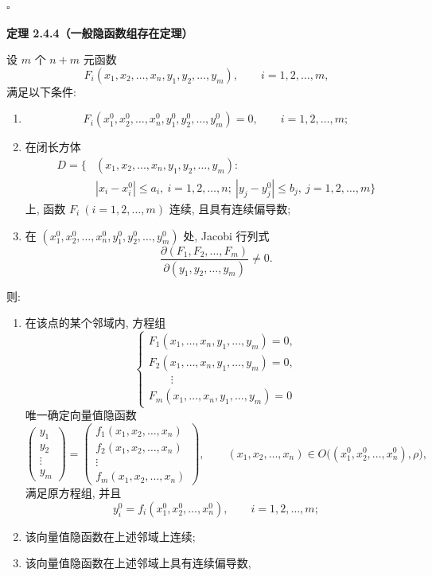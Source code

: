$\square$





\textbf{定理 2.4.4（一般隐函数组存在定理）}


	设 $m$ 个 $n+m$ 元函数
	\[
	F_i(x_1,x_2,\ldots,x_n,y_1,y_2,\ldots,y_m),
	\qquad i=1,2,\ldots,m,
	\]
	满足以下条件:
	\begin{enumerate}
		\item
		\[
		F_i(x_1^0,x_2^0,\ldots,x_n^0,y_1^0,y_2^0,\ldots,y_m^0)
		=0,
		\qquad i=1,2,\ldots,m;
		\]
		\item 在闭长方体
		\[
		\begin{aligned}
		D=\bigl\{&(x_1,x_2,\ldots,x_n,y_1,y_2,\ldots,y_m):\\
		&|x_i-x_i^0|\le a_i,\ i=1,2,\ldots,n;\ 
		|y_j-y_j^0|\le b_j,\ j=1,2,\ldots,m
		\bigr\}
		\end{aligned}
		\]
		上, 函数 $F_i\ (i=1,2,\ldots,m)$ 连续,
		且具有连续偏导数;
		\item 在
		$(x_1^0,x_2^0,\ldots,x_n^0,y_1^0,y_2^0,\ldots,y_m^0)$
		处, Jacobi 行列式
		\[
		\frac{\partial(F_1,F_2,\ldots,F_m)}
		{\partial(y_1,y_2,\ldots,y_m)}
		\ne0.
		\]
	\end{enumerate}
	则:
	\begin{enumerate}
		\item[(i)] 在该点的某个邻域内, 方程组
		\[
		\begin{cases}
		F_1(x_1,\ldots,x_n,y_1,\ldots,y_m)=0,\\
		F_2(x_1,\ldots,x_n,y_1,\ldots,y_m)=0,\\
		\qquad\vdots\\
		F_m(x_1,\ldots,x_n,y_1,\ldots,y_m)=0
		\end{cases}
		\]
		唯一确定向量值隐函数
		\[
		\begin{pmatrix}
		y_1\\y_2\\ \vdots\\y_m
		\end{pmatrix}
		=
		\begin{pmatrix}
		f_1(x_1,x_2,\ldots,x_n)\\
		f_2(x_1,x_2,\ldots,x_n)\\
		\vdots\\
		f_m(x_1,x_2,\ldots,x_n)
		\end{pmatrix},
		\qquad
		(x_1,x_2,\ldots,x_n)
		\in O\bigl((x_1^0,x_2^0,\ldots,x_n^0),\rho\bigr),
		\]
		满足原方程组, 并且
		\[
		y_i^0=f_i(x_1^0,x_2^0,\ldots,x_n^0),
		\qquad i=1,2,\ldots,m;
		\]
		\item[(ii)] 该向量值隐函数在上述邻域上连续;
		\item[(iii)] 该向量值隐函数在上述邻域上具有连续偏导数,
\end{enumerate}



